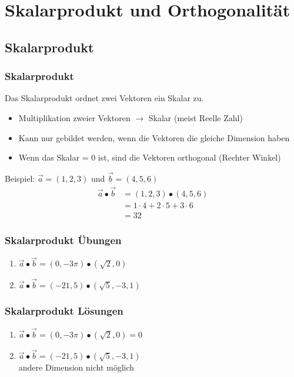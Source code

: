 \section{Skalarprodukt und Orthogonalität}
\subsection{Skalarprodukt}
\begin{frame}
    \frametitle{Skalarprodukt}
    Das Skalarprodukt ordnet zwei Vektoren ein Skalar zu.
    \begin{itemize}
	    \item Multiplikation zweier Vektoren $\rightarrow$ Skalar (meist Reelle Zahl)
	    \item Kann nur gebildet werden, wenn die Vektoren die gleiche Dimension haben
	    \item Wenn das Skalar = 0 ist, sind die Vektoren orthogonal (Rechter Winkel)
    \end{itemize}
	Beispiel: $\vec{a} = (1,2,3)$ und $\vec{b} = (4,5,6)$
	\begin{align*}
		\vec{a} \bullet \vec{b} &= (1,2,3) \bullet (4,5,6) \\
		&= 1 \cdot 4 + 2 \cdot 5 + 3 \cdot 6 \\
		&= 32
	\end{align*}
\end{frame}


\begin{frame}
    \frametitle{Skalarprodukt Übungen}
	\begin{enumerate}
		\item $\vec{a} \bullet \vec{b} = (0, -3\pi) \bullet (\sqrt{2}, 0)$ 
		\item $\vec{a} \bullet \vec{b} = (-21, 5) \bullet (\sqrt{5}, -3, 1)$
	\end{enumerate}
\end{frame}

\begin{frame}
    \frametitle{Skalarprodukt Lösungen}
	\begin{enumerate}
		\item $\vec{a} \bullet \vec{b} = (0, -3\pi) \bullet (\sqrt{2}, 0) = 0$ 
		\item $\vec{a} \bullet \vec{b} = (-21, 5) \bullet (\sqrt{5}, -3, 1)$ \\andere Dimension nicht möglich
	\end{enumerate}
\end{frame}

